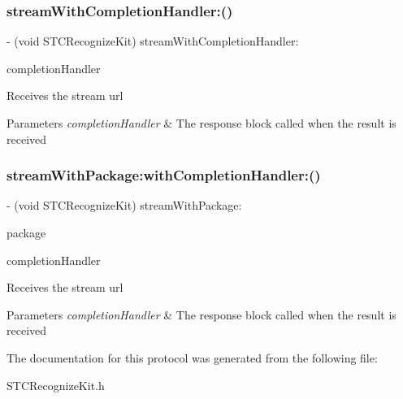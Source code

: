 \subsubsection{\texorpdfstring{stream\+With\+Completion\+Handler\+:()}{streamWithCompletionHandler:()}}
{\footnotesize\ttfamily -\/ (void S\+T\+C\+Recognize\+Kit) stream\+With\+Completion\+Handler\+: \begin{DoxyParamCaption}\item[{(Recognize\+Completion\+Handler)}]{completion\+Handler }\end{DoxyParamCaption}}

Receives the stream url 
\begin{DoxyParams}{Parameters}
{\em completion\+Handler} & The response block called when the result is received \\
\hline
\end{DoxyParams}
\hypertarget{protocol_s_t_c_recognize_kit_01-p_a80d49abc983107365e536a1bda519a95}{}\label{protocol_s_t_c_recognize_kit_01-p_a80d49abc983107365e536a1bda519a95} 
\subsubsection{\texorpdfstring{stream\+With\+Package\+:with\+Completion\+Handler\+:()}{streamWithPackage:withCompletionHandler:()}}
{\footnotesize\ttfamily -\/ (void S\+T\+C\+Recognize\+Kit) stream\+With\+Package\+: \begin{DoxyParamCaption}\item[{(N\+S\+String $\ast$)}]{package }\item[{withCompletionHandler:(Recognize\+Completion\+Handler)}]{completion\+Handler }\end{DoxyParamCaption}}

Receives the stream url 
\begin{DoxyParams}{Parameters}
{\em completion\+Handler} & The response block called when the result is received \\
\hline
\end{DoxyParams}


The documentation for this protocol was generated from the following file\+:\begin{DoxyCompactItemize}
\item 
S\+T\+C\+Recognize\+Kit.\+h\end{DoxyCompactItemize}

